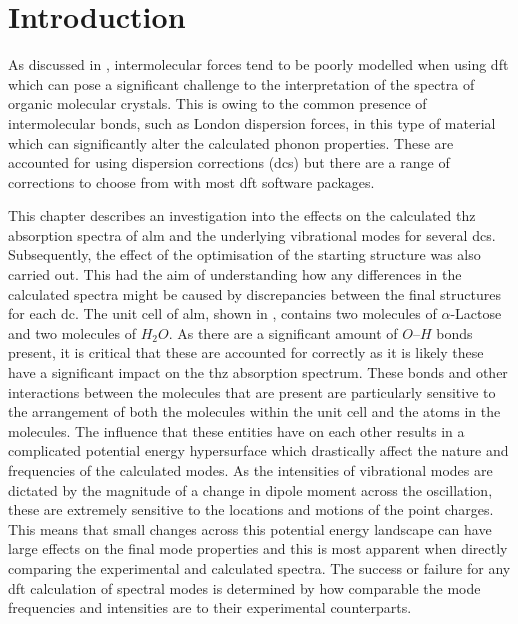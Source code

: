 \section{Introduction}
As discussed in , intermolecular forces tend to be poorly modelled when using \acrshort{dft} which can pose a significant challenge to the interpretation of the spectra of organic molecular crystals. This is owing to the common presence of intermolecular bonds, such as London dispersion forces, in this type of material which can significantly alter the calculated phonon properties. These are accounted for using dispersion corrections (\acrshort{dc}s) but there are a range of corrections to choose from with most \acrshort{dft} software packages. 

This chapter describes an investigation into the effects on the calculated \acrshort{thz} absorption spectra of \acrshort{alm} and the underlying vibrational modes for several \acrshort{dc}s. Subsequently, the effect of the optimisation of the starting structure was also carried out. This had the aim of understanding how any differences in the calculated spectra might be caused by discrepancies between the final structures for each \acrshort{dc}. The unit cell of \acrshort{alm}, shown in , contains two molecules of \(\alpha\)\nobreakdash-Lactose and two molecules of \(H_2O\). As there are a significant amount of \(O\)\nobreakdash--\(H\) bonds present, it is critical that these are accounted for correctly as it is likely these have a significant impact on the \acrshort{thz} absorption spectrum. These bonds and other interactions between the molecules that are present are particularly sensitive to the arrangement of both the molecules within the unit cell and the atoms in the molecules. The influence that these entities have on each other results in a complicated potential energy hypersurface which drastically affect the nature and frequencies of the calculated modes. As the intensities of vibrational modes are dictated by the magnitude of a change in dipole moment across the oscillation, these are extremely sensitive to the locations and motions of the point charges. This means that small changes across this potential energy landscape can have large effects on the final mode properties and this is most apparent when directly comparing the experimental and calculated spectra. The success or failure for any \acrshort{dft} calculation of spectral modes is determined by how comparable the mode frequencies and intensities are to their experimental counterparts. 

